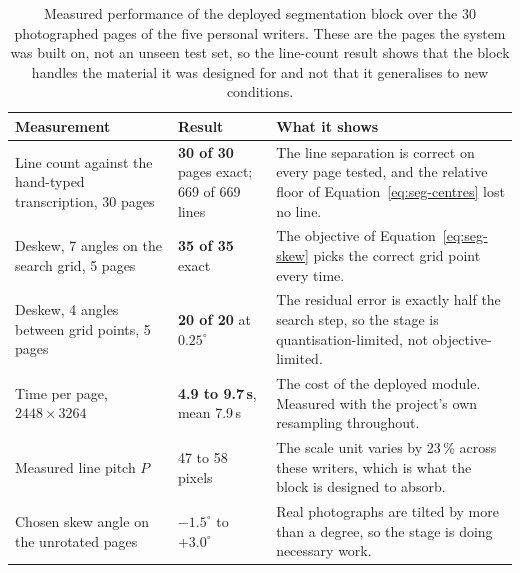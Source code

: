 \begin{table}[h]
\centering
\fontsize{9}{11}\selectfont
\setlength{\tabcolsep}{4pt}
\begin{tabularx}{\linewidth}{|p{4.3cm}|p{3.3cm}|X|}
\hline
\textbf{Measurement} & \textbf{Result} & \textbf{What it shows} \\
\hline
Line count against the hand-typed transcription, 30 pages & \textbf{30 of 30} pages exact; 669 of 669 lines & The line separation is correct on every page tested, and the relative floor of Equation~\ref{eq:seg-centres} lost no line. \\
\hline
Deskew, 7 angles on the search grid, 5 pages & \textbf{35 of 35} exact & The objective of Equation~\ref{eq:seg-skew} picks the correct grid point every time. \\
\hline
Deskew, 4 angles between grid points, 5 pages & \textbf{20 of 20} at $0.25^\circ$ & The residual error is exactly half the search step, so the stage is quantisation-limited, not objective-limited. \\
\hline
Time per page, $2448\times3264$ & \textbf{4.9 to 9.7\,s}, mean 7.9\,s & The cost of the deployed module. Measured with the project's own resampling throughout. \\
\hline
Measured line pitch $P$ & 47 to 58 pixels & The scale unit varies by 23\,\% across these writers, which is what the block is designed to absorb. \\
\hline
Chosen skew angle on the unrotated pages & $-1.5^\circ$ to $+3.0^\circ$ & Real photographs are tilted by more than a degree, so the stage is doing necessary work. \\
\hline
\end{tabularx}
\caption{Measured performance of the deployed segmentation block over the 30 photographed pages of the five personal writers. These are the pages the system was built on, not an unseen test set, so the line-count result shows that the block handles the material it was designed for and not that it generalises to new conditions.}
\label{tab:seg-test}
\end{table}

